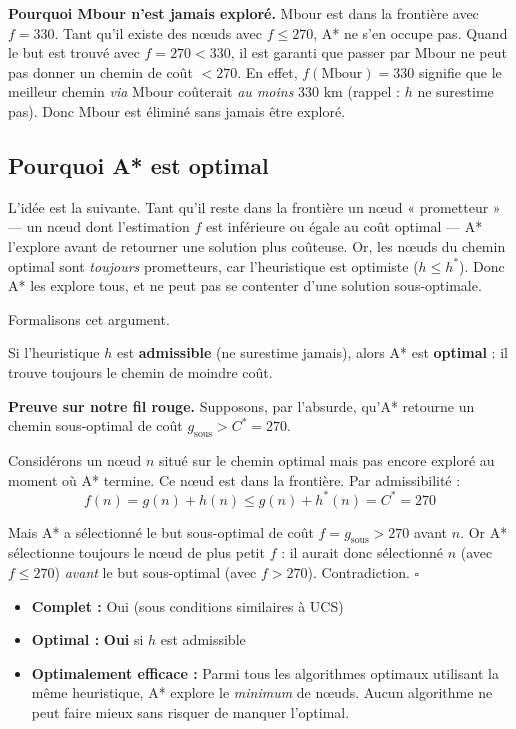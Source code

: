 \documentclass[11pt,a4paper]{article}
\begin{document}
\textbf{Pourquoi Mbour n'est jamais exploré.} Mbour est dans la frontière avec $f = 330$. Tant qu'il existe des nœuds avec $f \leq 270$, A* ne s'en occupe pas. Quand le but est trouvé avec $f = 270 < 330$, il est garanti que passer par Mbour ne peut pas donner un chemin de coût $< 270$. En effet, $f(\text{Mbour}) = 330$ signifie que le meilleur chemin \textit{via} Mbour coûterait \textit{au moins} 330 km (rappel : $h$ ne surestime pas). Donc Mbour est éliminé sans jamais être exploré.

\subsection{Pourquoi A* est optimal}

L'idée est la suivante. Tant qu'il reste dans la frontière un nœud « prometteur » — un nœud dont l'estimation $f$ est inférieure ou égale au coût optimal — A* l'explore avant de retourner une solution plus coûteuse. Or, les nœuds du chemin optimal sont \textit{toujours} prometteurs, car l'heuristique est optimiste ($h \leq h^*$). Donc A* les explore tous, et ne peut pas se contenter d'une solution sous-optimale.

Formalisons cet argument.

\begin{theorembox}
Si l'heuristique $h$ est \textbf{admissible} (ne surestime jamais), alors A* est \textbf{optimal} : il trouve toujours le chemin de moindre coût.
\end{theorembox}

\textbf{Preuve sur notre fil rouge.} Supposons, par l'absurde, qu'A* retourne un chemin sous-optimal de coût $g_{\text{sous}} > C^* = 270$. 

Considérons un nœud $n$ situé sur le chemin optimal mais pas encore exploré au moment où A* termine. Ce nœud est dans la frontière. Par admissibilité :
$$f(n) = g(n) + h(n) \leq g(n) + h^*(n) = C^* = 270$$

Mais A* a sélectionné le but sous-optimal de coût $f = g_{\text{sous}} > 270$ avant $n$. Or A* sélectionne toujours le nœud de plus petit $f$ : il aurait donc sélectionné $n$ (avec $f \leq 270$) \textit{avant} le but sous-optimal (avec $f > 270$). Contradiction. $\square$

\begin{theorembox}[Propriétés de A*]
\begin{itemize}
    \item \textbf{Complet :} Oui (sous conditions similaires à UCS)
    \item \textbf{Optimal :} \textbf{Oui} si $h$ est admissible
    \item \textbf{Optimalement efficace :} Parmi tous les algorithmes optimaux utilisant la même heuristique, A* explore le \textit{minimum} de nœuds. Aucun algorithme ne peut faire mieux sans risquer de manquer l'optimal.
\end{itemize}
\end{theorembox}
\end{document}
